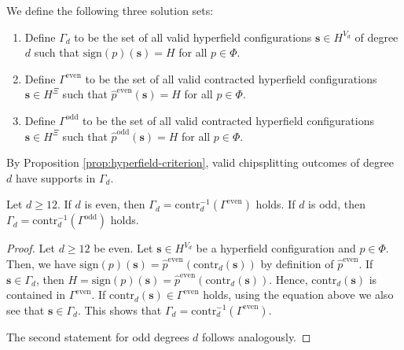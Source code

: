 \begin{definition}\label{def:sdjsndjknsdj}
    We define the following three solution sets:
    \begin{enumerate}
        \item     Define \( \Gamma_d \) to be the set of all valid hyperfield configurations \( \mathbf{s} \in H^{V_d} \) of degree \( d \) such that \( \mathrm{sign}(p)(\mathbf{s}) = H \) for all \( p \in \Phi \).

        \item     Define \( \Gamma^{\mathrm{even}} \) to be the set of all valid contracted hyperfield configurations \( \mathbf{s} \in H^{\Xi} \) such that \( \hat p^{\mathrm{even}}(\mathbf{s}) = H \) for all \( p \in \Phi \).

        \item     Define \( \Gamma^{\mathrm{odd}} \) to be the set of all valid contracted hyperfield configurations \( \mathbf{s} \in H^{\Xi} \) such that \( \hat p^{\mathrm{odd}}(\mathbf{s}) = H \) for all \( p \in \Phi \).
    \end{enumerate}
\end{definition}

By Proposition \ref{prop:hyperfield-criterion}, valid chipsplitting outcomes of degree \( d \) have supports in \( \Gamma_d \). 

\begin{proposition}\label{prop:sign-sikjsfnf3223423432}
    Let \( d \geq 12 \). If \( d \) is even, then \( \Gamma_d = \mathrm{contr}_d^{-1}(\Gamma^{\mathrm{even}}) \) holds. If \( d \) is odd, then \( \Gamma_d = \mathrm{contr}_d^{-1}(\Gamma^{\mathrm{odd}}) \) holds.
\end{proposition}

\begin{proof}
    Let \( d \geq 12 \) be even. Let \( \mathbf{s} \in {H}^{V_d} \) be a hyperfield configuration and \( p \in \Phi \). Then, we have \( \mathrm{sign}(p)(\mathbf{s}) = \hat p^{\mathrm{even}}(\mathrm{contr}_d(\mathbf{s})) \)
    by definition of \( \hat p^{\mathrm{even}} \). If \( \mathbf{s} \in \Gamma_d \), then \( H = \mathrm{sign}(p)(\mathbf{s}) = \hat p^{\mathrm{even}}(\mathrm{contr}_d(\mathbf{s})) \). Hence, \( \mathrm{contr}_d(\mathbf{s}) \) is contained in \( \Gamma^{\mathrm{even}} \). If \( \mathrm{contr}_d(\mathbf{s}) \in \Gamma^{\mathrm{even}} \) holds, using the equation above we also see that \( \mathbf{s} \in \Gamma_d \). This shows that \( \Gamma_d = \mathrm{contr}_d^{-1}(\Gamma^{\mathrm{even}}) \).

    The second statement for odd degrees \( d \) follows analogously.
\end{proof}


